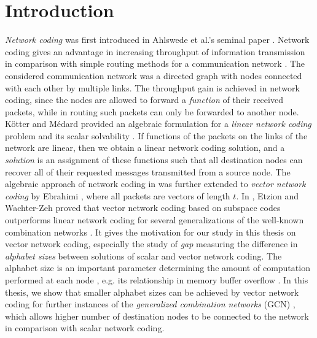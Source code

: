 \chapter{Introduction} \label{chap:introduction}

\textit{Network coding} was first introduced in Ahlswede et al.'s
seminal paper \cite{Ahlswede:2000}. Network coding gives an advantage
in increasing throughput of information transmission in comparison
with simple routing methods for a communication network \cite{Li:2003,Ho:2003}.
The considered communication network was a directed graph with nodes
connected with each other by multiple links. The throughput gain is
achieved in network coding, since the nodes are allowed to forward
a \textit{function} of their received packets, while in routing such
packets can only be forwarded to another node. K\"otter and M\'edard
provided an algebraic formulation for a \textit{linear network coding}
problem and its scalar solvability \cite{Koetter:2003}. If functions
of the packets on the links of the network are linear, then we obtain
a linear network coding solution, and a \textit{solution} is an assignment
of these functions such that all destination nodes can recover all
of their requested messages transmitted from a source node. The algebraic
approach of network coding in \cite{Koetter:2003} was further extended
to \textit{vector network coding} by Ebrahimi \cite{Ebrahimi:2011},
where all packets are vectors of length $t$. In \cite{Wachter-Zeh:2018},
Etzion and Wachter-Zeh proved that vector network coding based on
subspace codes outperforms linear network coding for several generalizations
of the well-known combination networks \cite{Riis:2006}. It gives
the motivation for our study in this thesis on vector network coding,
especially the study of \textit{gap} measuring the difference in \textit{alphabet
sizes} between solutions of scalar and vector network coding. The
alphabet size is an important parameter determining the amount of
computation performed at each node \cite{Wachter-Zeh:2018}, e.g.
its relationship in memory buffer overflow \cite{Ho:2008,Fragouli:2006,Gone:2018}.
In this thesis, we show that smaller alphabet sizes can be achieved
by vector network coding for further instances of the \textit{generalized
combination networks} (GCN) \cite{Wachter-Zeh:2018}, which allows
higher number of destination nodes to be connected to the network
in comparison with scalar network coding.

